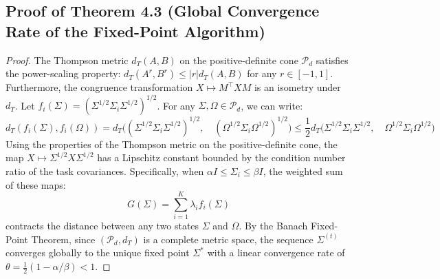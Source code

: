 \documentclass{article}
\theoremstyle{plain}
\theoremstyle{definition}
\theoremstyle{remark}
\begin{document}
\subsection{Proof of Theorem 4.3 (Global Convergence Rate of the Fixed-Point Algorithm)}
\label{appendix:proof-convergence}
\begin{proof}
The Thompson metric $d_T(A, B)$ on the positive-definite cone $\mathcal{P}_d$ satisfies the power-scaling property: $d_T(A^r, B^r) \leq |r| d_T(A, B)$ for any $r \in [-1, 1]$.
Furthermore, the congruence transformation $X \mapsto M^\top X M$ is an isometry under $d_T$. 
Let $f_i(\Sigma) = (\Sigma^{1/2} \Sigma_i \Sigma^{1/2})^{1/2}$. For any $\Sigma, \Omega \in \mathcal{P}_d$, we can write:
\begin{equation}
  d_T(f_i(\Sigma), f_i(\Omega)) = d_T\Big( (\Sigma^{1/2} \Sigma_i \Sigma^{1/2})^{1/2}, \quad (\Omega^{1/2} \Sigma_i \Omega^{1/2})^{1/2} \Big) \leq \frac{1}{2} d_T\Big( \Sigma^{1/2} \Sigma_i \Sigma^{1/2}, \quad \Omega^{1/2} \Sigma_i \Omega^{1/2} \Big)
\end{equation}
Using the properties of the Thompson metric on the positive-definite cone, the map $X \mapsto \Sigma^{1/2} X \Sigma^{1/2}$ has a Lipschitz constant bounded by the condition number ratio of the task covariances. Specifically, when $\alpha I \le \Sigma_i \le \beta I$, the weighted sum of these maps:
\begin{equation}
  G(\Sigma) = \sum_{i=1}^K \lambda_i f_i(\Sigma)
\end{equation}
contracts the distance between any two states $\Sigma$ and $\Omega$. By the Banach Fixed-Point Theorem, since $(\mathcal{P}_d, d_T)$ is a complete metric space, the sequence $\Sigma^{(t)}$ converges globally to the unique fixed point $\Sigma^*$ with a linear convergence rate of $\theta = \frac{1}{2} (1 - \alpha/\beta) < 1$.
\end{proof}
\end{document}
